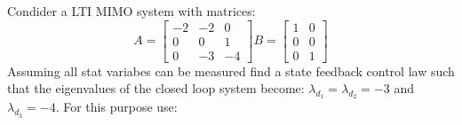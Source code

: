 \item Condider a LTI MIMO system with matrices:
  \begin{equation}
    A =
    \begin{bmatrix}
      -2 & -2 & 0 \\
      0 & 0 & 1 \\
      0 & -3 & -4 
    \end{bmatrix}
    B =
    \begin{bmatrix}
      1 & 0 \\
      0 & 0 \\
      0 & 1
    \end{bmatrix}
  \end{equation}
  Assuming all stat variabes can be measured find a state feedback control law such that the eigenvalues of the
  closed loop system  become: $\lambda_{d_1} =\lambda_{d_2} = -3$ and $\lambda_{d_3} = -4$. For this purpose use:
